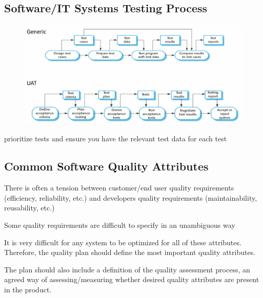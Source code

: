 \documentclass[]{project_plan}
\begin{document}
\newpage

\subsection{Software/IT Systems Testing Process}

\begin{figure}[H]
  \centering
  \includegraphics[width=\linewidth]{SoftwareIT Systems Testing Process.png}
\end{figure}

prioritize tests and ensure you have the relevant test data for each test

\subsection{Common Software Quality Attributes}

There is often a tension between customer/end user quality requirements (efficiency, reliability, etc.) and
developers quality requirements (maintainability, reusability, etc.)

Some quality requirements are difficult to specify in an unambiguous way

It is very difficult for any system to be optimized for all of these attributes. Therefore, the quality plan
should define the most important quality attributes.

The plan should also include a definition of the quality
assessment process, an agreed way of assessing/measuring whether desired quality attributes are present
in the product.
\end{document}
